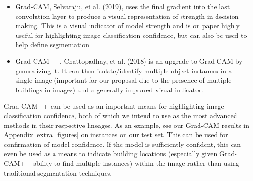 \documentclass{article}
\begin{document}
\begin{itemize} %
    \item Grad-CAM, Selvaraju, et al.\cite{selvaraju} (2019), uses the final gradient into the last convolution layer to produce a visual representation of strength in decision making. This is a visual indicator of model strength and is on paper highly useful for highlighting image classification confidence, but can also be used to help define segmentation. 
    \item Grad-CAM++, Chattopadhay, et al.\cite{chattopadhay} (2018) is an upgrade to Grad-CAM by generalizing it. It can then isolate/identify multiple object instances in a single image (important for our proposal due to the presence of multiple buildings in images) and a generally improved visual indicator. 
\end{itemize}

Grad-CAM++ can be used as an important means for highlighting image classification confidence, both of which we intend to use as the most advanced methods in their respective lineages. As an example, see our Grad-CAM results in Appendix \ref{extra_figures} on instances on our test set. This can be used for confirmation of model confidence. If the model is sufficiently confident, this can even be used as a means to indicate building locations (especially given Grad-CAM++ ability to find multiple instances) within the image rather than using traditional segmentation techniques.
\end{document}
